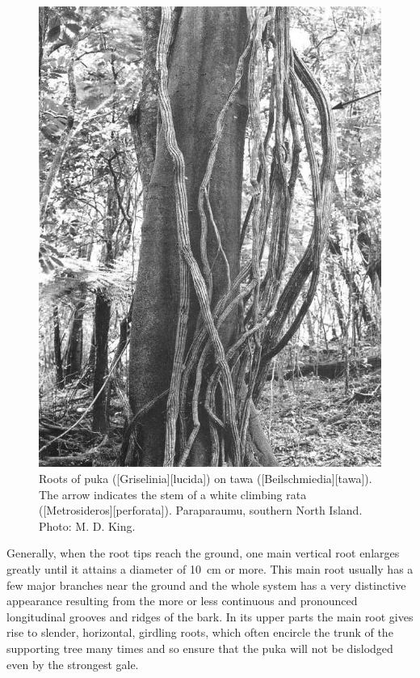 \begin{figure}[htb]
\begin{minipage}[t]{0.494\textwidth}
    	\includegraphics[width=\textwidth]{graphics/figure47puka-roots.jpg}
    	\caption[Roots of puka on tawa]{Roots of puka ([Griselinia][lucida]) on tawa ([Beilschmiedia][tawa]).
    	The arrow indicates the stem of a white climbing rata ([Metrosideros][perforata]).
    	Paraparaumu, southern North Island.
    	Photo: M. D. King.}%
    	\label{fig:47puka-roots}
	\end{minipage}
\end{figure}

Generally, when the root tips reach the ground, one main vertical root enlarges greatly until it attains a diameter of \SI{10}{\centi\metre} or more.
This main root usually has a few major branches near the ground and the whole system has a very distinctive appearance resulting from the more or less continuous and pronounced longitudinal grooves and ridges of the bark.
In its upper parts the main root gives rise to slender, horizontal, girdling roots, which often encircle the trunk of the supporting tree many times and so ensure that the puka will not be dislodged even by the strongest gale.

